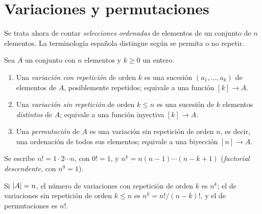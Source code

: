 \addtocounter{definicion}{1}%

\section{Variaciones y permutaciones}

Se trata ahora de contar \emph{selecciones ordenadas} de elementos de un conjunto de $n$ elementos. La terminología española distingue según se permita o no repetir.

\begin{definicion}
Sea $A$ un conjunto con $n$ elementos y $k\ge 0$ un entero.
\begin{enumerate}
  \item Una \emph{variación con repetición} de orden $k$ es una sucesión $(a_1,\dots,a_k)$ de elementos de $A$, posiblemente repetidos; equivale a una función $[k]\to A$.
  \item Una \emph{variación sin repetición} de orden $k\le n$ es una sucesión de $k$ elementos \emph{distintos} de $A$; equivale a una función inyectiva $[k]\to A$.
  \item Una \emph{permutación} de $A$ es una variación sin repetición de orden $n$, es decir, una ordenación de todos sus elementos; equivale a una biyección $[n]\to A$.
\end{enumerate}
Se escribe $n!=1\cdot2\cdots n$, con $0!=1$, y $n^{\underline{k}}=n(n-1)\cdots(n-k+1)$ (\emph{factorial descendente}, con $n^{\underline{0}}=1$).
\end{definicion}

\begin{teorema}\label{teo:t1-variaciones}
Si $\lvert A\rvert=n$, el número de variaciones con repetición de orden $k$ es $n^{k}$; el de variaciones sin repetición de orden $k\le n$ es $n^{\underline{k}}=n!/(n-k)!$, y el de permutaciones es $n!$.
\end{teorema}

\addtocounter{definicion}{1}%

\addtocounter{definicion}{1}%

\addtocounter{definicion}{1}%

\addtocounter{definicion}{1}%

